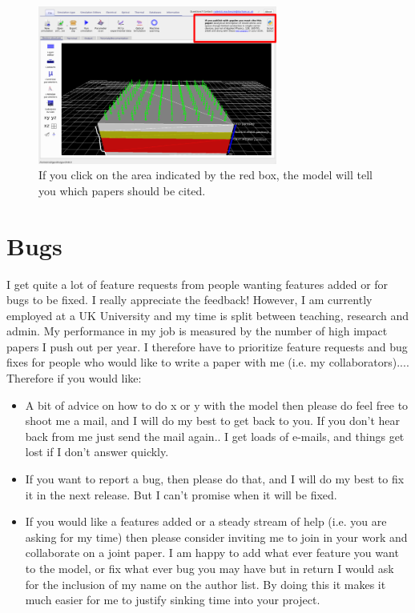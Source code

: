 \begin{figure}[H]
\centering
\includegraphics[width=0.7\textwidth]{./images/cite_me2.png}
\caption{If you click on the area indicated by the red box, the model will tell you which papers should be cited.}
\label{fig:cite_me}
\end{figure}

\section{Bugs}
I get quite a lot of feature requests from people wanting features added or for bugs to be fixed. I really appreciate the feedback!  However, I am currently employed at a UK University and my time is split between teaching, research and admin. My performance in my job is measured by the number of high impact papers I push out per year. I therefore have to prioritize feature requests and bug fixes for people who would like to write a paper with me (i.e. my collaborators).... Therefore if you would like:

\begin{itemize}
  \item A bit of advice on how to do x or y with the model then please do feel free to shoot me a mail, and I will do my best to get back to you. If you don't hear back from me just send the mail again.. I get loads of e-mails, and things get lost if I don't answer quickly.
  \item If you want to report a bug, then please do that, and I will do my best to fix it in the next release. But I can't promise when it will be fixed.
  \item  If you would like a features added or a steady stream of help (i.e. you are asking for my time) then please consider inviting me to join in your work and collaborate on a joint paper. I am happy to add what ever feature you want to the model, or fix what ever bug you may have but in return I would ask for the inclusion of my name on the author list. By doing this it makes it much easier for me to justify sinking time into your project.
\end{itemize}
    

